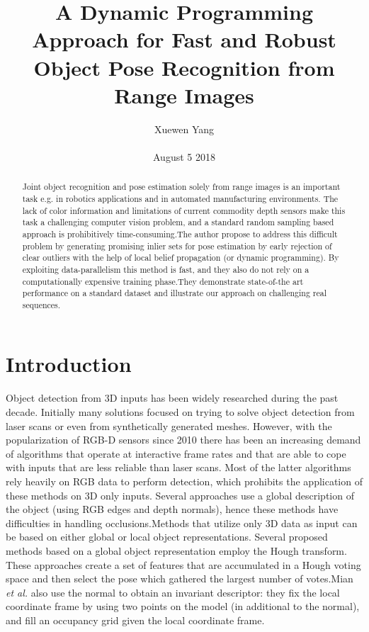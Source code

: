 \documentclass[10pt,twocolumn,letterpaper]{article}
\author{Xuewen Yang\\\\
August 5 2018}
\title{A Dynamic Programming Approach for Fast and Robust Object Pose Recognition from Range Images}
\begin{document}
\maketitle
\begin{abstract}
Joint object recognition and pose estimation solely from
range images is an important task e.g. in robotics applications
and in automated manufacturing environments. The
lack of color information and limitations of current commodity
depth sensors make this task a challenging computer
vision problem, and a standard random sampling based approach
is prohibitively time-consuming.The author propose to address
this difficult problem by generating promising inlier
sets for pose estimation by early rejection of clear outliers
with the help of local belief propagation (or dynamic programming).
By exploiting data-parallelism this method is
fast, and they also do not rely on a computationally expensive
training phase.They demonstrate state-of-the art performance
on a standard dataset and illustrate our approach on
challenging real sequences.
\end{abstract}
\section{Introduction}
Object detection from 3D inputs has been widely researched
during the past decade. Initially many solutions
focused on trying to solve object detection from
laser scans or even from synthetically generated meshes\cite{Drost2010Model}\cite{Johnson2002Using}. However, with the popularization of RGB-D
sensors since 2010 there has been an increasing demand of
algorithms that operate at interactive frame
rates and that are able to cope with inputs that are less reliable
than laser scans. Most of the latter algorithms rely
heavily on RGB data to perform detection, which prohibits
the application of these methods on 3D only inputs. Several
approaches use a global description of the object
(using RGB edges and depth normals), hence these methods
have difficulties in handling occlusions.Methods that utilize only 3D data as input can be based
on either global or local object representations. Several proposed
methods based on a global object representation employ
the Hough transform. These approaches
create a set of features that are accumulated in a Hough voting
space and then select the pose which gathered the largest
number of votes.Mian~\emph{ et al.}\cite{Mian2006Three}
also use the normal to obtain an invariant descriptor: they
fix the local coordinate frame by using two points on the
model (in additional to the normal), and fill an occupancy
grid given the local coordinate frame.
\end{document}
